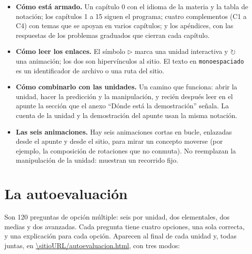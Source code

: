 \documentclass[11pt,a4paper]{report}
\begin{document}
\begin{itemize}
  \item \textbf{Cómo está armado.} Un capítulo 0 con el idioma de la materia y la tabla de notación; los capítulos 1 a 15 siguen el programa; cuatro complementos (C1 a C4) con temas que se apoyan en varios capítulos; y los apéndices, con las respuestas de los problemas graduados que cierran cada capítulo.
  \item \textbf{Cómo leer los enlaces.} El símbolo \(\triangleright\) marca una unidad interactiva y \(\circlearrowright\) una animación; los dos son hipervínculos al sitio. El texto en \texttt{monoespaciado} es un identificador de archivo o una ruta del sitio.
  \item \textbf{Cómo combinarlo con las unidades.} Un camino que funciona: abrir la unidad, hacer la predicción y la manipulación, y recién después leer en el apunte la sección que el anexo \enquote{Dónde está la demostración} señala. La cuenta de la unidad y la demostración del apunte usan la misma notación.
  \item \textbf{Las seis animaciones.} Hay seis animaciones cortas en bucle, enlazadas desde el apunte y desde el sitio, para mirar un concepto moverse (por ejemplo, la composición de rotaciones que no conmuta). No reemplazan la manipulación de la unidad: muestran un recorrido fijo.
\end{itemize}

\section{La autoevaluación}\label{sec:autoevaluacion}

Son 120 preguntas de opción múltiple: seis por unidad, dos elementales, dos medias y dos avanzadas. Cada pregunta tiene cuatro opciones, una sola correcta, y una explicación para cada opción. Aparecen al final de cada unidad y, todas juntas, en \url{\sitioURL/autoevaluacion.html}, con tres modos:
\end{document}

